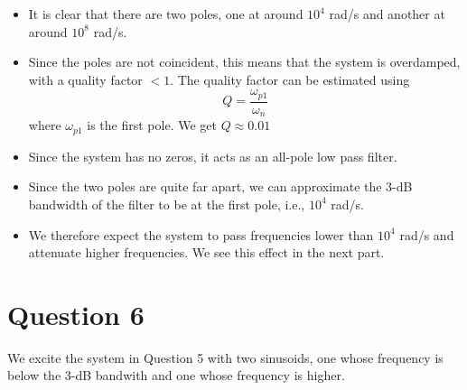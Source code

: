 \documentclass[11pt]{article}
\begin{document}
	
		
    \begin{itemize}
\item
  It is clear that there are two poles, one at around \(10^4\) rad/s and
  another at around \(10^8\) rad/s.
\item
  Since the poles are not coincident, this means that the system is
  overdamped, with a quality factor \(<1\). The quality factor can be
  estimated using \[Q = \frac{\omega_{p1}}{\omega_n}\] where
  \(\omega_{p1}\) is the first pole. We get \(Q \approx 0.01\)
\item
  Since the system has no zeros, it acts as an all-pole low pass filter.
\item
  Since the two poles are quite far apart, we can approximate the 3-dB
  bandwidth of the filter to be at the first pole, i.e., \(10^4\) rad/s.
\item
  We therefore expect the system to pass frequencies lower than \(10^4\)
  rad/s and attenuate higher frequencies. We see this effect in the next
  part.
\end{itemize}

	

	
		
    \section{Question 6}\label{question-6}

We excite the system in Question 5 with two sinusoids, one whose
frequency is below the 3-dB bandwith and one whose frequency is higher.

	

	
		
	
	
		
	
		
			
		
	
		
			
		
	
		
			
		
	
		
			
		
	
		
			
		
	
		
			
		
	
		
			
		
	
		
			
		
	
		
			
\end{document}
